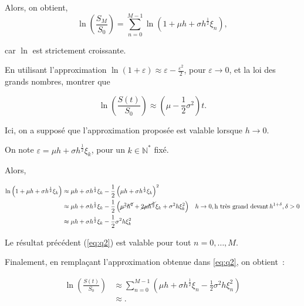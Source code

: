 \documentclass[answers, 10pt]{exam}
\begin{document}
\begin{questions}
\begin{solutionorbox}
		Alors, on obtient,
		\begin{equation}\label{eq:q2}
			\ln \left( \frac{S_M}{S_0} \right) = \sum_{n=0}^{M-1} \ln(1 + \mu h + \sigma h^{\frac{1}{2}} \xi_n)
			,
		\end{equation}

		car $\ln$ est strictement croissante.

	\end{solutionorbox}

	\question

	En utilisant l'approximation $\ln(1 + \varepsilon) \approx \varepsilon - \frac{\varepsilon^2}{2}$, pour $\varepsilon \to 0$, et la loi des grands nombres, montrer que

	\begin{equation*}
		\ln \left(  \frac{S(t)}{S_0} \right) \approx \left( \mu - \frac{1}{2} \sigma^2 \right)t.
	\end{equation*}

	Ici, on a supposé que l'approximation proposée est valable lorsque $h\to 0$.

	\begin{solutionorbox}
		On note $\varepsilon = \mu h + \sigma h ^{\frac{1}{2}} \xi_k$,
		pour un $k\in \mathbb{N}^*$ fixé.

		Alors,

		\begin{align*}
			\ln \left( 1 + \mu h + \sigma h^{\frac{1}{2}}\xi_k \right) &\approx \mu h + \sigma h^{\frac{1}{2}} \xi_k - \frac{1}{2} \left( \mu h + \sigma h^{\frac{1}{2}}\xi_k \right)^2\\
										   &\approx \mu h + \sigma h^{\frac{1}{2}} \xi_k - \frac{1}{2} \left( \cancel{\mu^2 h^2} + \cancel{2\mu h^{\frac{3}{2}}} \xi_k  + \sigma^2 h \xi_k^2 \right) & h\to 0, \text{h très grand devant}\, h^{1 + \delta}, \delta > 0
\\
									      &\approx \mu h + \sigma h^{\frac{1}{2}} \xi_k - \frac{1}{2} \sigma^2 h \xi_k^2 	
		\end{align*}

		Le résultat précédent (\cref{eq:q2}) est valable pour tout
		$n=0,\dots,M$.

		Finalement, en remplaçant l'approximation obtenue dans
		\cref{eq:q2}, on obtient~:

		\begin{align*}
			\ln \left(  \frac{S(t)}{S_0} \right) &\approx \sum_{n=0}^{M-1}\left(  \mu h + \sigma h^{\frac{1}{2}} \xi_n - \frac{1}{2} \sigma^2 h \xi_n^2 \right)  \\
							     &\approx 
			.
		\end{align*}
	\end{solutionorbox}
	


\end{questions}
\end{document}
